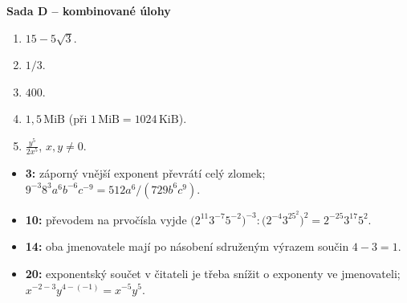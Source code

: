 \documentclass[11pt,a4paper]{article}
\begin{document}
\textbf{Sada D -- kombinované úlohy}
\begin{enumerate}[label=\textbf{\arabic*.},leftmargin=10mm,start=16]
\item $\boxed{15-5\sqrt3}$.
\item $\boxed{1/3}$.
\item $\boxed{400}$.
\item $\boxed{1{,}5\,\mathrm{MiB}}$ (při $1\,\mathrm{MiB}=1024\,\mathrm{KiB}$).
\item $\displaystyle\boxed{\frac{y^5}{2x^5}}$, $x,y\ne0$.
\end{enumerate}

\begin{itemize}
\item \textbf{3:} záporný vnější exponent převrátí celý zlomek;
$9^{-3}8^3a^6b^{-6}c^{-9}=512a^6/(729b^6c^9)$.
\item \textbf{10:} převodem na prvočísla vyjde
$\bigl(2^{11}3^{-7}5^{-2}\bigr)^{-3}:
\bigl(2^{-4}3^25^2\bigr)^2=2^{-25}3^{17}5^2$.
\item \textbf{14:} oba jmenovatele mají po násobení sdruženým výrazem
součin $4-3=1$.
\item \textbf{20:} exponentský součet v čitateli je třeba snížit
o exponenty ve jmenovateli; $x^{-2-3}y^{4-(-1)}=x^{-5}y^5$.
\end{itemize}
\end{document}
